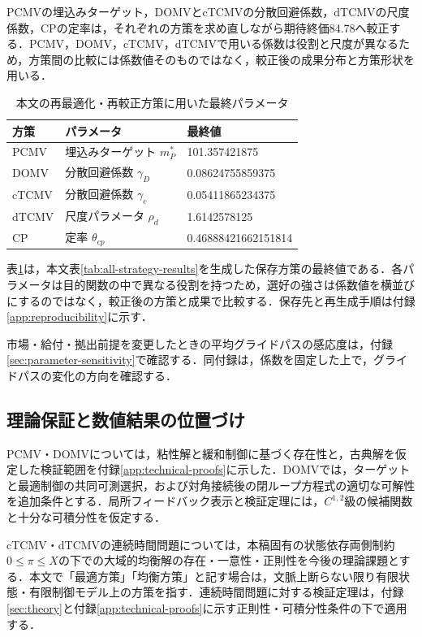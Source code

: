 \documentclass[10pt,a4paper]{article}
\theoremstyle{plain}
\theoremstyle{definition}
\begin{document}
PCMVの埋込みターゲット，DOMVとcTCMVの分散回避係数，dTCMVの尺度係数，CPの定率は，それぞれの方策を求め直しながら期待終価84.78へ較正する．PCMV，DOMV，cTCMV，dTCMVで用いる係数は役割と尺度が異なるため，方策間の比較には係数値そのものではなく，較正後の成果分布と方策形状を用いる．

\begin{table}[htbp]
\centering\small
\caption{本文の再最適化・再較正方策に用いた最終パラメータ}
\label{tab:final-calibration-parameters}
\begin{tabular}{lll}
\toprule
方策 & パラメータ & 最終値 \\
\midrule
PCMV & 埋込みターゲット $m_P^*$ & 101.357421875 \\
DOMV & 分散回避係数 $\gamma_D$ & 0.08624755859375 \\
cTCMV & 分散回避係数 $\gamma_c$ & 0.05411865234375 \\
dTCMV & 尺度パラメータ $\rho_d$ & 1.6142578125 \\
CP & 定率 $\theta_{cp}$ & 0.46888421662151814 \\
\bottomrule
\end{tabular}
\end{table}

表\ref{tab:final-calibration-parameters}は，本文表\ref{tab:all-strategy-results}を生成した保存方策の最終値である．各パラメータは目的関数の中で異なる役割を持つため，選好の強さは係数値を横並びにするのではなく，較正後の方策と成果で比較する．保存先と再生成手順は付録\ref{app:reproducibility}に示す．

市場・給付・拠出前提を変更したときの平均グライドパスの感応度は，付録\ref{sec:parameter-sensitivity}で確認する．同付録は，係数を固定した上で，グライドパスの変化の方向を確認する．

\subsection{理論保証と数値結果の位置づけ}\label{sec:method-scope}
PCMV・DOMVについては，粘性解と緩和制御に基づく存在性と，古典解を仮定した検証範囲を付録\ref{app:technical-proofs}に示した．DOMVでは，ターゲットと最適制御の共同可測選択，および対角接続後の閉ループ方程式の適切な可解性を追加条件とする．局所フィードバック表示と検証定理には，$C^{1,2}$級の候補関数と十分な可積分性を仮定する．

cTCMV・dTCMVの連続時間問題については，本稿固有の状態依存両側制約$0\leq\pi\leq X$の下での大域的均衡解の存在・一意性・正則性を今後の理論課題とする．本文で「最適方策」「均衡方策」と記す場合は，文脈上断らない限り有限状態・有限制御モデル上の方策を指す．連続時間問題に対する検証定理は，付録\ref{sec:theory}と付録\ref{app:technical-proofs}に示す正則性・可積分性条件の下で適用する．
\end{document}
